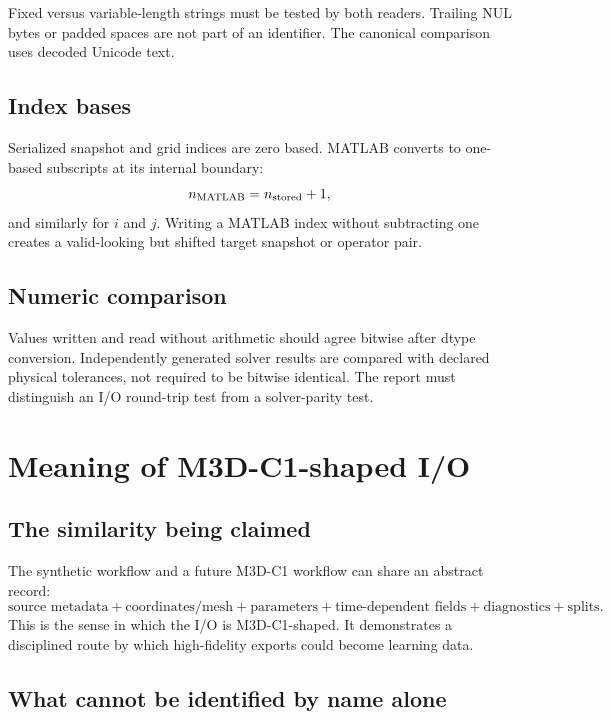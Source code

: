 \documentclass[11pt]{article}
\begin{document}
Fixed versus variable-length strings must be tested by both readers. Trailing NUL bytes or padded spaces are not part of an identifier. The canonical comparison uses decoded Unicode text.

\subsection{Index bases}

Serialized snapshot and grid indices are zero based. MATLAB converts to one-based subscripts at its internal boundary:
\begin{equation}
n_{\rm MATLAB}=n_{\rm stored}+1,
\end{equation}
and similarly for $i$ and $j$. Writing a MATLAB index without subtracting one creates a valid-looking but shifted target snapshot or operator pair.

\subsection{Numeric comparison}

Values written and read without arithmetic should agree bitwise after dtype conversion. Independently generated solver results are compared with declared physical tolerances, not required to be bitwise identical. The report must distinguish an I/O round-trip test from a solver-parity test.

\section{Meaning of M3D-C1-shaped I/O}
\label{sec:m3dc1}

\subsection{The similarity being claimed}

The synthetic workflow and a future M3D-C1 workflow can share an abstract record:
\begin{equation}
\text{source metadata}
+\text{coordinates/mesh}
+\text{parameters}
+\text{time-dependent fields}
+\text{diagnostics}
+\text{splits}.
\end{equation}
This is the sense in which the I/O is M3D-C1-shaped. It demonstrates a disciplined route by which high-fidelity exports could become learning data.

\subsection{What cannot be identified by name alone}
\end{document}
